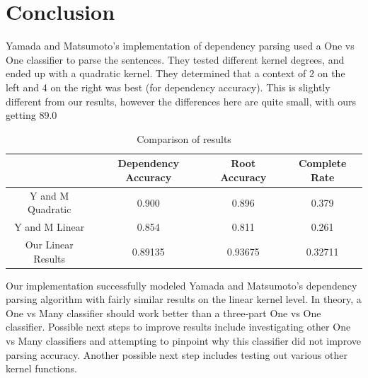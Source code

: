 \documentclass[12pt]{amsart}
\begin{document}
\section{Conclusion}
Yamada and Matsumoto's implementation of dependency parsing used a One vs One classifier to parse the sentences. They tested different kernel degrees, and ended up with a quadratic kernel. They determined that a context of 2 on the left and 4 on the right was best (for dependency accuracy). This is slightly different from our results, however the differences here are quite small, with ours getting 89.0%
\begin{table}
\caption{Comparison of results}
 \begin{tabular}{cccc}
            \hline \hline & Dependency Accuracy & Root Accuracy & Complete Rate \\ \hline
            Y and M Quadratic & 0.900 & 0.896 & 0.379 \\ 
            Y and M Linear & 0.854 & 0.811 & 0.261 \\ 
            Our Linear Results & 0.89135 & 0.93675 & 0.32711 \\
            \hline

        \end{tabular}
\end{table}
Our implementation successfully modeled Yamada and Matsumoto's dependency parsing algorithm with fairly similar results on the linear kernel level. In theory, a One vs Many classifier should work better than a three-part One vs One classifier. Possible next steps to improve results include investigating other One vs Many classifiers and attempting to pinpoint why this classifier did not improve parsing accuracy. Another possible next step includes testing out various other kernel functions.
        


        

\end{document}
